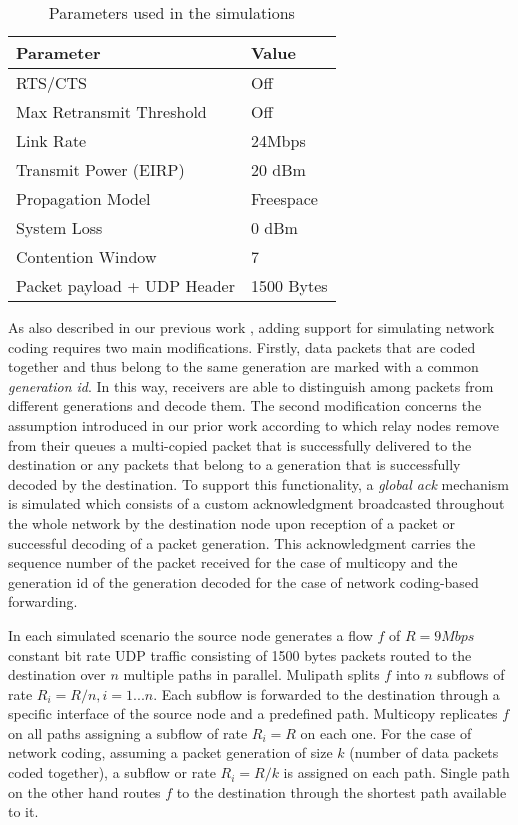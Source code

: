 \documentclass[journal, onecolumn, 12pt]{IEEEtran}
\begin{document}
\begin{table}[t]
\caption{Parameters used in the simulations}
\label{tab:param_simul}
\begin{center}
\begin{tabular}{ll}
\hline
Parameter & Value\\ \hline
RTS/CTS & Off\\
Max Retransmit Threshold & Off\\
Link Rate & 24Mbps\\
Transmit Power (EIRP) & 20 dBm\\
Propagation Model & Freespace\\
System Loss & 0 dBm\\
Contention Window & 7\\
Packet payload + UDP Header & 1500 Bytes\\
\hline
\end{tabular}
\end{center}
\end{table}

As also described in our previous work \cite{6335387}, adding support for simulating network coding requires two main modifications. Firstly, data packets that are coded together
and thus belong to the same generation are marked with a common \textit{generation id}. In this way, receivers are able
to distinguish among packets from different generations and decode them.
The second modification concerns the assumption introduced in our prior work \cite{ref:papas_hop_by_hop} according to which relay nodes remove from their queues a multi-copied packet that is successfully delivered to the destination or any
packets that belong to a generation that is successfully decoded by the destination. To support this functionality,
a \textit{global ack} mechanism is simulated which consists of a custom acknowledgment broadcasted throughout the whole network by the destination node upon
reception of a packet or successful decoding
of a packet generation.
This acknowledgment carries the sequence number of the packet received for the case of multicopy and the generation id of
the generation decoded for the case of network coding-based forwarding.

In each simulated scenario the source node generates a flow $f$ of $R=9Mbps$ constant bit rate UDP traffic consisting of 1500 bytes packets routed to the destination over $n$ multiple paths in parallel.
Mulipath splits $f$ into $n$ subflows of rate $R_{i}=R/n, i=1...n$.
Each subflow is forwarded to the destination through a specific interface of the source node and a predefined path.
Multicopy replicates $f$ on all paths assigning a subflow of rate $R_{i}=R$ on each one.
For the case of network coding, assuming a packet generation of size $k$ (number of data packets coded together), a subflow or rate $R_{i}=R/k$ is assigned on each path.
Single path on the other hand routes $f$ to the destination through the shortest path available to it.
\end{document}
